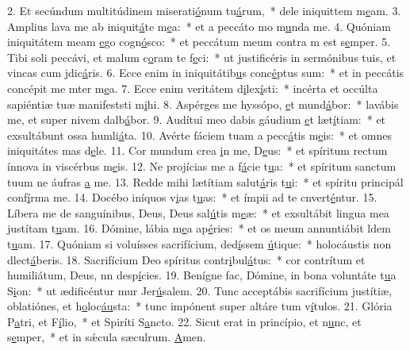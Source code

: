2. Et secúndum multitúdinem miserati\uline{ó}num tu\uline{á}rum,~* dele iniquittem m\uline{e}am.
3. Amplius lava me ab iniquit\uline{á}te m\uline{e}a:~* et a peccáto mo m\uline{u}nda me.
4. Quóniam iniquitátem meam \uline{e}go cogn\uline{ó}sco:~* et peccátum meum contra m est s\uline{e}mper.
5. Tibi soli peccávi, et malum c\uline{o}ram te f\uline{e}ci:~* ut justificéris in sermónibus tuis, et vincas cum jdic\uline{á}ris.
6. Ecce enim in iniquitátib\uline{u}s conc\uline{é}ptus sum:~* et in peccátis concépit me mter m\uline{e}a.
7. Ecce enim veritátem d\uline{i}lex\uline{í}sti:~* incérta et occúlta sapiéntiæ tuæ manifeststi m\uline{i}hi.
8. Aspérges me hyssópo, \uline{e}t mund\uline{á}bor:~* lavábis me, et super nivem dalb\uline{á}bor.
9. Audítui meo dabis gáudium \uline{e}t læt\uline{í}tiam:~* et exsultábunt ossa humli\uline{á}ta.
10. Avérte fáciem tuam a pecc\uline{á}tis m\uline{e}is:~* et omnes iniquitátes mas d\uline{e}le.
11. Cor mundum crea \uline{i}n me, D\uline{e}us:~* et spíritum rectum ínnova in viscérbus m\uline{e}is.
12. Ne projícias me a f\uline{á}cie t\uline{u}a:~* et spíritum sanctum tuum ne áufras \uline{a} me.
13. Redde mihi lætítiam salut\uline{á}ris t\uline{u}i:~* et spíritu principál conf\uline{í}rma me.
14. Docébo iníquos v\uline{i}as t\uline{u}as:~* et ímpii ad te cnvert\uline{é}ntur.
15. Líbera me de sanguínibus, Deus, Deus sal\uline{ú}tis m\uline{e}æ:~* et exsultábit lingua mea justítam t\uline{u}am.
16. Dómine, lábia m\uline{e}a ap\uline{é}ries:~* et os meum annuntiábit ldem t\uline{u}am.
17. Quóniam si voluísses sacrifícium, ded\uline{í}ssem \uline{ú}tique:~* holocáustis non dlect\uline{á}beris.
18. Sacrifícium Deo spíritus contr\uline{i}bul\uline{á}tus:~* cor contrítum et humiliátum, Deus, nn desp\uline{í}cies.
19. Benígne fac, Dómine, in bona voluntáte t\uline{u}a S\uline{i}on:~* ut ædificéntur mur Jer\uline{ú}salem.
20. Tunc acceptábis sacrifícium justítiæ, oblatiónes, et h\uline{o}loc\uline{áu}sta:~* tunc impónent super altáre tum v\uline{í}tulos.
21. Glória P\uline{a}tri, et F\uline{í}lio,~* et Spiríti S\uline{a}ncto.
22. Sicut erat in princípio, et n\uline{u}nc, et s\uline{e}mper,~* et in sǽcula sæculrum. \uline{A}men.
